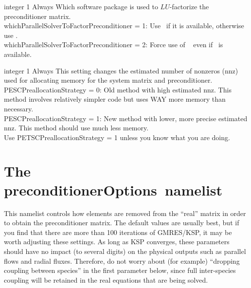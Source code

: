 \myhrule

{integer}
{1}
{Always}
{Which software package is used to $LU$-factorize the preconditioner matrix.\\

{\ttfamily whichParallelSolverToFactorPreconditioner} = 1: Use \mumps~if it is available, otherwise use \superludist.\\

{\ttfamily whichParallelSolverToFactorPreconditioner} = 2: Force use of \superludist~ even if \mumps~is available.
}

\myhrule

{integer}
{1}
{Always}
{This setting changes the estimated number of nonzeros (nnz) used for allocating memory for the system matrix and preconditioner.\\

{\ttfamily PESCPreallocationStrategy} = 0: Old method with high estimated nnz. This method involves relatively simpler code but uses WAY more memory than necessary.\\

{\ttfamily PESCPreallocationStrategy} = 1: New method with lower, more precise estimated nnz.  This method should use much less memory.\\

Use {\ttfamily PETSCPreallocationStrategy} = 1 unless you know what you are doing.}









\section{The {\ttfamily preconditionerOptions}~namelist}

This namelist controls how elements are removed from the ``real'' matrix in order to obtain
the preconditioner matrix. The default values are usually best, but if you find that there are more than 100 iterations
of GMRES/KSP, it may be worth adjusting these settings.  As long as KSP converges, these parameters
should have no impact (to several digits) on the physical outputs such as parallel flows and radial fluxes.
Therefore, do not worry about (for example) ``dropping coupling between species'' in the first
parameter below, since full inter-species coupling will be retained in the real equations that are being solved.

